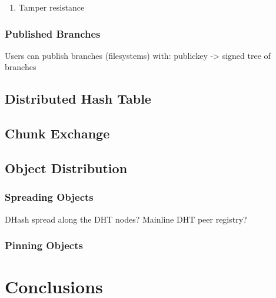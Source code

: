 \documentclass{sig-alternate}
\begin{document}
\begin{enumerate}
  \item Tamper resistance
\end{enumerate}

\subsubsection{Published Branches}

Users can publish branches (filesystems) with:
publickey -> signed tree of branches


\subsection{Distributed Hash Table}
\subsection{Chunk Exchange}

\subsection{Object Distribution}

\subsubsection{Spreading Objects}

DHash spread along the DHT nodes?
Mainline DHT peer registry?

\subsubsection{Pinning Objects}


\section{Conclusions}






%
%
\end{document}
